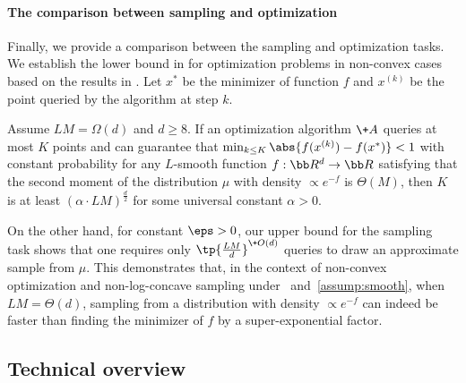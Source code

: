 \documentclass[11pt,a4paper]{article}
\begin{document}

\paragraph{The comparison between sampling and optimization} 

Finally, we provide a comparison between the sampling and optimization tasks. We establish the lower bound in  for optimization problems in non-convex cases based on the results in \cite{MCJ+19}. Let $x^*$ be the minimizer of function $f$ and $x^{(k)}$ be the point queried by the algorithm at step $k$. 
\begin{theorem}\label{thm:main-opt-lb}
    Assume $LM=\Omega(d)$ and $d\geq 8$. If an optimization algorithm $\+A$ queries at most $K$ points and can guarantee that $\min_{k\leq K} \abs{f(x^{(k)}) - f(x^*)}<1$ with constant probability for any $L$-smooth function $f:\bb R^d\to \bb R$ satisfying that the second moment of the distribution $\mu$ with density $\propto e^{-f}$ is $\Theta(M)$, then $K$ is at least $ (\alpha\cdot LM)^{\frac{d}{2}}$ for some universal constant $\alpha>0$.
\end{theorem}
On the other hand, for constant $\eps>0$, our upper bound for the sampling task shows that one requires only $\tp{\frac{LM}{d}}^{\+O(d)}$ queries to draw an approximate sample from $\mu$. This demonstrates that, in the context of non-convex optimization and non-log-concave sampling under ~and~\ref{assump:smooth}, when $LM=\Theta(d)$, sampling from a distribution with density $\propto e^{-f}$ can indeed be faster than finding the minimizer of $f$ by a super-exponential factor.



\subsection{Technical overview}
\end{document}
